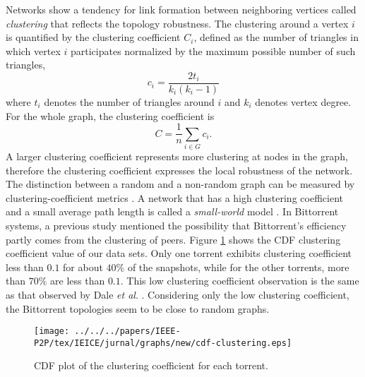 Networks show a tendency for link formation between neighboring vertices called \textit{clustering} that reflects the topology robustness.
The clustering around a vertex $i$ is quantified by the clustering coefficient $C_i$, defined as the number of triangles in which vertex $i$ participates normalized by the maximum possible number of such triangles,
\begin{equation}
c_i = \frac{2t_i}{k_i(k_i - 1)} 
\end{equation}
where $t_i$ denotes the number of triangles around $i$ and $k_i$ denotes vertex degree.
For the whole graph, the clustering coefficient is
\begin{equation}
C = \frac{1}{n} \sum_{i \in G} c_i.
\end{equation} 
A larger clustering coefficient represents more clustering at nodes in the graph, therefore the clustering coefficient expresses the local robustness of the network.
The distinction between a random and a non-random graph can be measured by clustering-coefficient metrics \cite{watts1998collective}.
A network that has a high clustering coefficient and a small average path length is called a \textit{small-world} model \cite{watts1998collective}.
In Bittorrent systems, a previous study \cite{legout2007clustering} mentioned the possibility that Bittorrent's efficiency partly comes from the clustering of peers.
Figure \ref{fig:cdf-clustering} shows the CDF clustering coefficient value of our data sets.
Only one torrent exhibits clustering coefficient less than $0.1$ for about $40\%$ of the snapshots, while for the other torrents, more than  $70\%$ are less than $0.1$.
This low clustering coefficient observation is the same as that observed by Dale \textit{et al}. \cite{dale2008evolution}.
Considering only the low clustering coefficient, the Bittorrent topologies seem to be close to random graphs.

\begin{figure}[!tb] 
\begin{center}
\texttt{[image: ../../../papers/IEEE-P2P/tex/IEICE/jurnal/graphs/new/cdf-clustering.eps]}
\end{center}
\caption{CDF plot of the clustering coefficient for each torrent.}%
\label{fig:cdf-clustering}
\end{figure}

